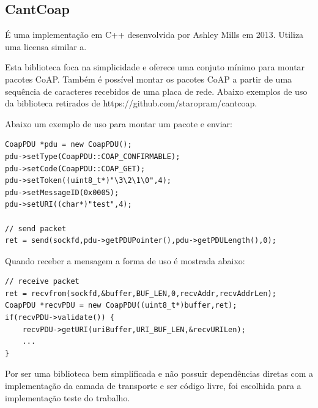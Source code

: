 \subsection{CantCoap}
\'E uma implementa\c{c}\~ao em C++ desenvolvida por Ashley Mills em 2013. Utiliza uma licensa similar a.

Esta biblioteca foca na simplicidade e oferece uma conjuto m\'inimo para montar pacotes CoAP. Tamb\'em \'e poss\'ivel montar os pacotes CoAP a partir de uma sequ\^encia de caracteres recebidos de uma placa de rede.
Abaixo exemplos de uso da biblioteca retirados de https://github.com/staropram/cantcoap.


\lstset{escapechar=@,style=customc}

Abaixo um exemplo de uso para montar um pacote e enviar:

\begin{lstlisting}
CoapPDU *pdu = new CoapPDU();
pdu->setType(CoapPDU::COAP_CONFIRMABLE);
pdu->setCode(CoapPDU::COAP_GET);
pdu->setToken((uint8_t*)"\3\2\1\0",4);
pdu->setMessageID(0x0005);
pdu->setURI((char*)"test",4);

// send packet 
ret = send(sockfd,pdu->getPDUPointer(),pdu->getPDULength(),0);
\end{lstlisting}

Quando receber a mensagem a forma de uso \'e mostrada abaixo:
\begin{lstlisting}
// receive packet
ret = recvfrom(sockfd,&buffer,BUF_LEN,0,recvAddr,recvAddrLen);
CoapPDU *recvPDU = new CoapPDU((uint8_t*)buffer,ret);
if(recvPDU->validate()) {
    recvPDU->getURI(uriBuffer,URI_BUF_LEN,&recvURILen);
    ...
}
\end{lstlisting}

Por ser uma biblioteca bem simplificada e n\~ao possuir depend\^encias diretas com a implementa\c{c}\~ao da camada de transporte e ser c\'odigo livre, foi escolhida para a implementa\c{c}\~ao teste do trabalho.
